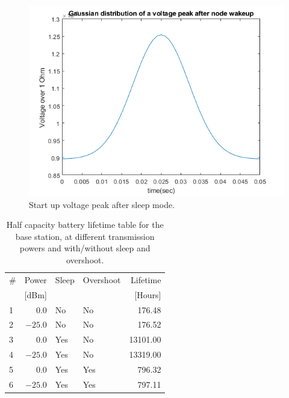 \begin{figure}[h]
	\centering
	\includegraphics[width=\linewidth]{theory/energyCalculations/fig/gaussianDistributionsOfVoltagePeak.png}
	\caption{Start up voltage peak after sleep mode.}
	\label{fig:gaussianDistributionsOfVoltagePeak}
\end{figure}

\begin{table}[h]
	\centering
	\begin{tabularx}{\linewidth}{|l|r|l|X|r|}
		\hline
		\#	& Power		& Sleep	& Overshoot	& Lifetime	\\
		    & [dBm]		& 		& 		& [Hours]	\\ \hline
		1	& $0.0$		& No	& No	& 176.48	\\ \hline
		2	& $-25.0$	& No	& No	& 176.52	\\ \hline
		3	& $0.0$		& Yes	& No	& 13101.00	\\ \hline
		4	& $-25.0$	& Yes	& No	& 13319.00	\\ \hline
		5	& $0.0$		& Yes	& Yes	& 796.32	\\ \hline
		6	& $-25.0$	& Yes	& Yes	& 797.11	\\ \hline
	\end{tabularx}
	\caption{Half capacity battery lifetime table for the base station, at different transmission powers and with/without sleep and overshoot.}
	\label{tab:halfLifetimeBaseStation}
\end{table}